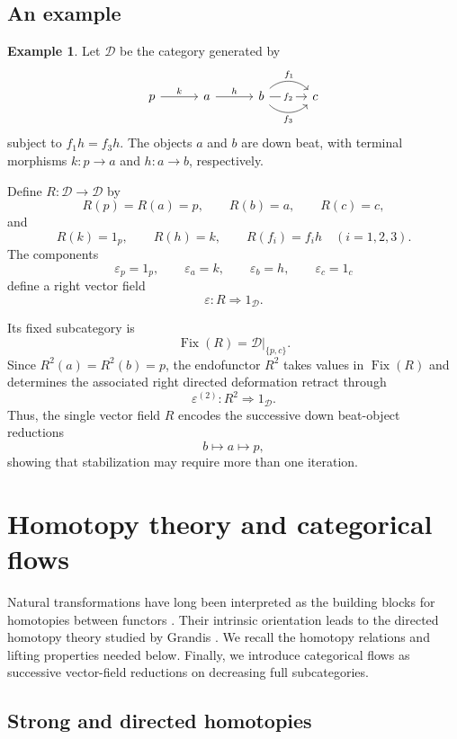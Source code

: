 \documentclass[12pt]{amsart}
\theoremstyle{definition}
\newtheorem{example}[teo]{Example}
\theoremstyle{remark}
\numberwithin{figure}{section}%
\begin{document}
\subsection{An example}
\label{subsec:complete_vector_field_example}

\begin{example}\label{ex:beat-point-vector-field}
Let \(\mathcal D\) be the category generated by
\[
\begin{tikzcd}[column sep=3em]
p \arrow[r, "k"]
&
a \arrow[r, "h"]
&
b
  \arrow[r, "f_1", bend left=45]
  \arrow[r, "f_2" description]
  \arrow[r, "f_3"', bend right=45]
&
c
\end{tikzcd}
\]
subject to \(f_1h=f_3h\). The objects \(a\) and \(b\) are down beat, with
terminal morphisms \(k\colon p\to a\) and \(h\colon a\to b\),
respectively.

Define \(R\colon\mathcal D\to\mathcal D\) by
\[
R(p)=R(a)=p,
\qquad
R(b)=a,
\qquad
R(c)=c,
\]
and
\[
R(k)=1_p,
\qquad
R(h)=k,
\qquad
R(f_i)=f_ih
\quad (i=1,2,3).
\]
The components
\[
\varepsilon_p=1_p,
\qquad
\varepsilon_a=k,
\qquad
\varepsilon_b=h,
\qquad
\varepsilon_c=1_c
\]
define a right vector field
\[
\varepsilon\colon R\Rightarrow1_{\mathcal D}.
\]

Its fixed subcategory is
\[
\operatorname{Fix}(R)
=
\mathcal D|_{\{p,c\}}.
\]
Since \(R^2(a)=R^2(b)=p\), the endofunctor \(R^2\) takes values in
\(\operatorname{Fix}(R)\) and determines the associated right directed
deformation retract through
\[
\varepsilon^{(2)}
\colon
R^2\Rightarrow1_{\mathcal D}.
\]
Thus, the single vector field \(R\) encodes the successive down
beat-object reductions
\[
b\longmapsto a\longmapsto p,
\]
showing that stabilization may require more than one iteration.
\end{example}

\section{Homotopy theory and categorical flows}
\label{sec:homotopy_fluxes}

Natural transformations have long been interpreted as the building blocks for homotopies between functors \cite{LEEHomotopy}. Their intrinsic orientation leads to the directed homotopy theory studied by Grandis \cite{GrandisShape}. We recall the homotopy relations and lifting properties needed below. Finally, we introduce categorical flows as successive vector-field reductions on decreasing full subcategories.

\subsection{Strong and directed homotopies}
\label{subsec:strong_directed_homotopies}
\end{document}
